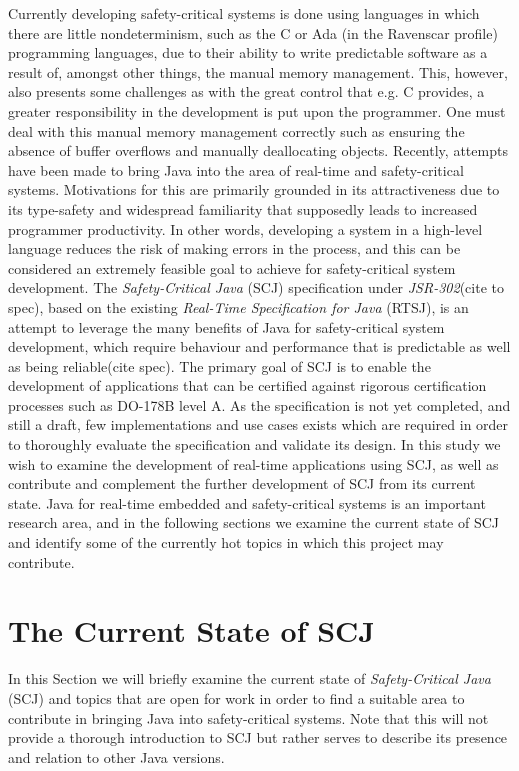 Currently developing safety-critical systems is done using languages in which there are little nondeterminism, such as the C or Ada (in the Ravenscar profile) programming languages, due to their ability to write predictable software as a result of, amongst other things, the manual memory management. This, however, also presents some challenges as with the great control that e.g. C provides, a greater responsibility in the development is put upon the programmer. One must deal with this manual memory management correctly such as ensuring the absence of buffer overflows and manually deallocating objects.
Recently, attempts have been made to bring Java into the area of real-time and safety-critical systems. Motivations for this are primarily grounded in its attractiveness due to its type-safety and widespread familiarity that supposedly leads to increased programmer productivity\cite{henties:2009-20}\cite{Nilsen96issuesin}. In other words, developing a system in a high-level language reduces the risk of making errors in the process, and this can be considered an extremely feasible goal to achieve for safety-critical system development.
The \textit{Safety-Critical Java} (SCJ) specification under \textit{JSR-302}\cite{JSR}(cite to spec), based on the existing \textit{Real-Time Specification for Java} (RTSJ), is an attempt to leverage the many benefits of Java for safety-critical system development, which require behaviour and performance that is predictable as well as being reliable(cite spec). The primary goal of SCJ is to enable the development of applications that can be certified against rigorous certification processes such as DO-178B level A. As the specification is not yet completed, and still a draft, few implementations and use cases exists which are required in order to thoroughly evaluate the specification and validate its design.
In this study we wish to examine the development of real-time applications using SCJ, as well as contribute and complement the further development of SCJ from its current state. Java for real-time embedded and safety-critical systems is an important research area, and in the following sections we examine the current state of SCJ and identify some of the currently hot topics in which this project may contribute.

\section{The Current State of SCJ}
In this Section we will briefly examine the current state of \textit{Safety-Critical Java} (SCJ) and topics that are open for work in order to find a suitable area to contribute in bringing Java into safety-critical systems. Note that this will not provide a thorough introduction to SCJ but rather serves to describe its presence and relation to other Java versions.

